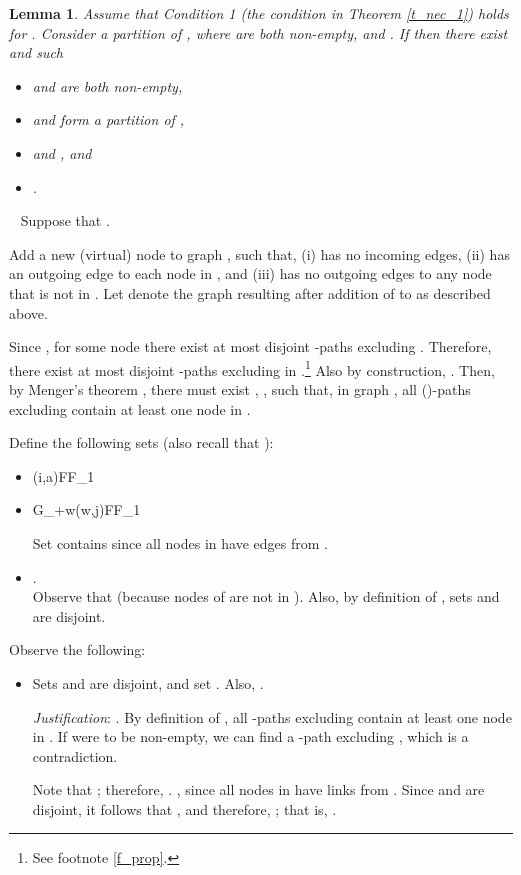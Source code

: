 \documentclass[letterpaper, 11pt]{article}
\newenvironment{proof}{\noindent {\bf Proof:}~}{\hspace*{\fill}}
\newtheorem{lemma}{Lemma}
\begin{document}
\begin{lemma}
\label{lemma:prop2}
Assume that Condition 1 (the condition in Theorem \ref{t_nec_1}) holds for .
Consider a partition
 of , where 
are both non-empty, and .
If  then there exist  and  such
\begin{itemize}
\item  and  are both non-empty,
\item  and  form a partition of ,
\item  and , and
\item .
\end{itemize}
\end{lemma}
\begin{proof}
Suppose that 
.

Add a new (virtual) node  to graph , such that, (i)  has no
incoming edges, (ii)  has an outgoing edge to each node
in , and (iii)  has no outgoing edges to any node that is not in .
Let  denote the graph resulting after addition of  to 
as described above.

Since , for some node 
there exist at most  disjoint -paths excluding .
Therefore, there exist at most  disjoint -paths excluding
 in .\footnote{See footnote \ref{f_prop}.}
Also by construction, . Then, by Menger's theorem \cite{Graph_theory_west}, there must exist
, ,
such that, in graph , all ()-paths excluding  
contain at least one node in .

Define the following sets (also recall that ):
\begin{itemize}
\item
(i,a)F\cup F_1

\item
G_{+w}(w,j)F\cup F_1

Set  contains  since all nodes in  have edges from .

\item .\\ Observe that  (because
	nodes of  are not in ). Also, by definition of
	, sets  and  are disjoint.
\end{itemize}
Observe the following:
\begin{itemize}
\item
Sets  and  are disjoint, and set .
Also, .

{\em Justification}: . By definition of ,
	all -paths excluding  contain at least one node in .
If  were to be non-empty, we can find a -path excluding
, which is a contradiction.

Note that ; therefore, .
, since all nodes in  have links from .
Since  and  are disjoint, it follows that ,
and therefore, ; that is, .




\end{itemize}
\end{proof}
\end{document}
